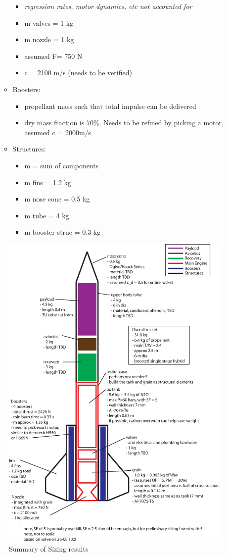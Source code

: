 \documentclass[12pt]{article}
\begin{document}
\begin{itemize}
\begin{itemize}
\begin{itemize}
\item \emph{regression rates, motor dynamics, etc not accounted for}
\item m valves = 1 kg
\item m nozzle = 1 kg
\item assumed F= 750 N
\item c = 2100 m/s (needs to be verified)
\end{itemize}
\item Boosters:
\begin{itemize}
\item propellant mass such that total impulse can be delivered
\item dry mass fraction is 70\%. Needs to be refined by picking a motor, assumed c = 2000m/s
\end{itemize}
\item Structures:
\begin{itemize}
\item m = sum of components
\item m fins = 1.2 kg
\item m nose cone = 0.5 kg
\item m tube = 4 kg
\item m  booster struc = 0.3 kg
\end{itemize}
\end{itemize}

\end{itemize}


\FloatBarrier
\begin{figure}[htbp]
   \centering
   \includegraphics[width=\linewidth]{sizing_result_Aug_26.eps}
   \caption{Summary of Sizing results}
   \label{fig:}
\end{figure}
\end{document}
